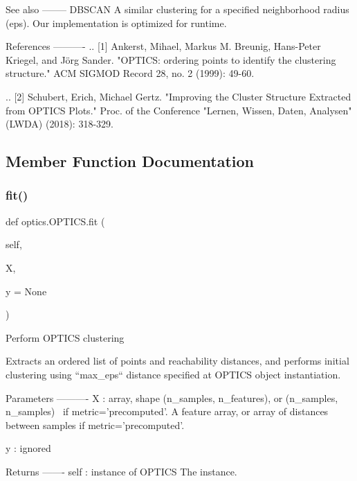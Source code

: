 \begin{DoxyVerb}
See also
--------
DBSCAN
    A similar clustering for a specified neighborhood radius (eps).
    Our implementation is optimized for runtime.

References
----------
.. [1] Ankerst, Mihael, Markus M. Breunig, Hans-Peter Kriegel,
   and Jörg Sander. "OPTICS: ordering points to identify the clustering
   structure." ACM SIGMOD Record 28, no. 2 (1999): 49-60.

.. [2] Schubert, Erich, Michael Gertz.
   "Improving the Cluster Structure Extracted from OPTICS Plots." Proc. of
   the Conference "Lernen, Wissen, Daten, Analysen" (LWDA) (2018): 318-329.
\end{DoxyVerb}
 

\subsection{Member Function Documentation}
\mbox{\label{classoptics_1_1OPTICS_a26560c1c03e886345e61e7f002cbb3ef}} 
\subsubsection{\texorpdfstring{fit()}{fit()}}
{\footnotesize\ttfamily def optics.\+O\+P\+T\+I\+C\+S.\+fit (\begin{DoxyParamCaption}\item[{}]{self,  }\item[{}]{X,  }\item[{}]{y = {\ttfamily None} }\end{DoxyParamCaption})}

\begin{DoxyVerb}Perform OPTICS clustering

Extracts an ordered list of points and reachability distances, and
performs initial clustering using ``max_eps`` distance specified at
OPTICS object instantiation.

Parameters
----------
X : array, shape (n_samples, n_features), or (n_samples, n_samples)  \
if metric=’precomputed’.
    A feature array, or array of distances between samples if
    metric='precomputed'.

y : ignored

Returns
-------
self : instance of OPTICS
    The instance.
\end{DoxyVerb}
 

